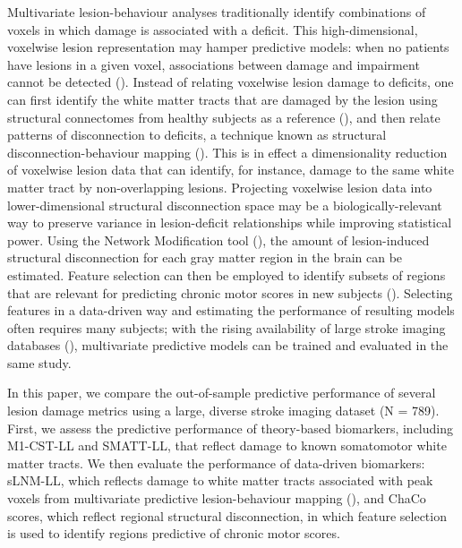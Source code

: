\documentclass[10pt]{article}
\begin{document}
Multivariate lesion-behaviour analyses traditionally identify combinations of voxels in which damage is associated with a deficit. This high-dimensional, voxelwise lesion representation may hamper predictive models: when no patients have lesions in a given voxel, associations between damage and impairment cannot be detected (\cite{Kimberg2007-sk, Rorden2009-ae,Sperber2020-kp,Griffis2019-cy}). Instead of relating voxelwise lesion damage to deficits, one can first identify the white matter tracts that are damaged by the lesion using structural connectomes from healthy subjects as a reference (\cite{Kuceyeski2013-nk, Foulon2018-bj}), and then relate patterns of disconnection to deficits, a technique known as structural disconnection-behaviour mapping (\cite{ Kuceyeski2016-vj, Wawrzyniak2022-kl, Salvalaggio2020-pe, Griffis2019-cy, Sperber2022-oj}). This is in effect a dimensionality reduction of voxelwise lesion data that can identify, for instance, damage to the same white matter tract by non-overlapping lesions. Projecting voxelwise lesion data into lower-dimensional structural disconnection space may be a biologically-relevant way to preserve variance in lesion-deficit relationships while improving statistical power. Using the Network Modification tool (\cite{Kuceyeski2013-nk}), the amount of lesion-induced structural disconnection for each gray matter region in the brain can be estimated. Feature selection can then be employed to identify subsets of regions that are relevant for predicting chronic motor scores in new subjects (\cite{Kasties2021-rm}). Selecting features in a data-driven way and estimating the performance of resulting models often requires many subjects; with the rising availability of large stroke imaging databases (\cite{Liew2020-ps}), multivariate predictive models can be trained and evaluated in the same study.

In this paper, we compare the out-of-sample predictive performance of several lesion damage metrics using a large, diverse stroke imaging dataset (N = 789). First, we assess the predictive performance of theory-based biomarkers, including M1-CST-LL and SMATT-LL, that reflect damage to known somatomotor white matter tracts. We then evaluate the performance of data-driven biomarkers: sLNM-LL, which reflects damage to white matter tracts associated with peak voxels from multivariate predictive lesion-behaviour mapping (\cite{Bowren2022-rs}), and ChaCo scores, which reflect regional structural disconnection, in which feature selection is used to identify regions predictive of chronic motor scores.
\end{document}
